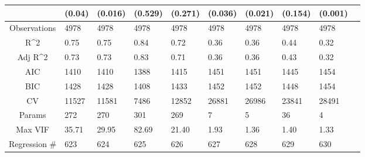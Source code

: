 \documentclass{article}
\begin{document}
\begin{table}[H]
\begin{tabular}{|clllllllll|}
   & (0.04) & (0.016) & (0.529) & (0.271) & (0.036) & (0.021) & (0.154) & (0.001) & \\ 
  \hline 
 Observations & 4978 & 4978 & 4978 & 4978 & 4978 & 4978 & 4978 & 4978 & \\ 
  R^2 & 0.75 & 0.75 & 0.84 & 0.72 & 0.36 & 0.36 & 0.44 & 0.32 & \\ 
  Adj R^2 & 0.73 & 0.73 & 0.83 & 0.71 & 0.36 & 0.36 & 0.43 & 0.32 & \\ 
  AIC & 1410 & 1410 & 1388 & 1415 & 1451 & 1451 & 1445 & 1454 & \\ 
  BIC & 1428 & 1428 & 1408 & 1433 & 1452 & 1452 & 1448 & 1454 & \\ 
  CV & 11527 & 11581 & 7486 & 12852 & 26881 & 26986 & 23841 & 28491 & \\ 
  Params & 272 & 270 & 301 & 269 & 7 & 5 & 36 & 4 & \\ 
  Max VIF & 35.71 & 29.95 & 82.69 & 21.40 & 1.93 & 1.36 & 1.40 & 1.33 & \\ 
  Regression \# & 623 & 624 & 625 & 626 & 627 & 628 & 629 & 630 & \\ 
   \hline
\end{tabular}
 
\end{table}
\end{document}
